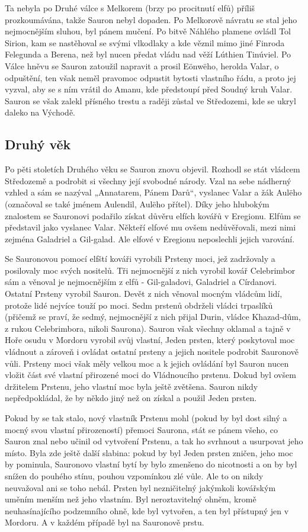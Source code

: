 \documentclass[12pt]{article}
\begin{document}
Ta nebyla po Druhé válce s Melkorem (brzy po procitnutí elfů) příliš prozkoumávána, takže Sauron nebyl dopaden. Po Melkorově návratu se stal jeho nejmocnějším sluhou, byl pánem mučení. Po bitvě Náhlého plamene ovládl Tol Sirion, kam se nastěhoval se svými vlkodlaky a kde věznil mimo jiné Finroda Felegunda a Berena, než byl nucen předat vládu nad věží Lúthien Tinúviel. Po Válce hněvu se Sauron zatoužil napravit a prosil Eönwëho, herolda Valar, o odpuštění, ten však neměl pravomoc odpustit bytosti vlastního řádu, a proto jej vyzval, aby se s ním vrátil do Amanu, kde předstoupí před Soudný kruh Valar. Sauron se však zalekl přísného trestu a raději zůstal ve Středozemi, kde se ukryl daleko na Východě. 

\subsection{Druhý věk}
Po pěti stoletích Druhého věku se Sauron znovu objevil. Rozhodl se stát vládcem Středozemě a podrobit si všechny její svobodné národy. Vzal na sebe nádherný vzhled a sám se nazýval „Annatarem, Pánem Darů“, vyslanec Valar a žák Aulëho (označoval se také jménem Aulendil, Aulëho přítel). Díky jeho hlubokým znalostem se Sauronovi podařilo získat důvěru elfích kovářů v Eregionu. Elfům se představil jako vyslanec Valar. Někteří elfové mu ovšem nedůvěřovali, mezi nimi zejména Galadriel a Gil-galad. Ale elfové v Eregionu neposlechli jejich varování.

Se Sauronovou pomocí elfští kováři vyrobili Prsteny moci, jež zadržovaly a posilovaly moc svých nositelů. Tři nejmocnější z nich vyrobil kovář Celebrimbor sám a věnoval je nejmocnějším z elfů - Gil-galadovi, Galadriel a Círdanovi. Ostatní Prsteny vyrobil Sauron. Devět z nich věnoval mocným vládcům lidí, protože lidé nejvíce touží po moci. Sedm prstenů obdrželi vládci trpaslíků (přičemž se praví, že sedmý, nejmocnější z nich přijal Durin, vládce Khazad-dûm, z rukou Celebrimbora, nikoli Saurona). Sauron však všechny oklamal a tajně v Hoře osudu v Mordoru vyrobil svůj vlastní, Jeden prsten, který poskytoval moc vládnout a zároveň i ovládat ostatní prsteny a jejich nositele podrobit Sauronově vůli. Prsteny moci však měly velkou moc a k jejich ovládání byl Sauron nucen vložit část své vlastní přirozené moci do Vládnoucího prstenu. Dokud byl ovšem držitelem Prstenu, jeho vlastní moc byla ještě zvětšena. Sauron nikdy nepředpokládal, že by někdo jiný než on získal a použil Jeden prsten.

Pokud by se tak stalo, nový vlastník Prstenu mohl (pokud by byl dost silný a mocný svou vlastní přirozeností) přemoci Saurona, stát se pánem všeho, co Sauron znal nebo učinil od vytvoření Prstenu, a tak ho svrhnout a usurpovat jeho místo. Byla zde ještě další slabina: pokud by byl Jeden prsten zničen, jeho moc by pominula, Sauronovo vlastní bytí by bylo zmenšeno do nicotnosti a on by byl snížen do pouhého stínu, pouhou vzpomínkou zlé vůle. Ale to on nikdy neuvažoval ani se toho nebál. Prsten byl nezničitelný jakýmkoli kovářským uměním menším než jeho vlastním. Byl neroztavitelný ohněm, kromě neuhasínajícího podzemního ohně, kde byl vytvořen, a ten byl přístupný jen v Mordoru. A v každém případě byl na Sauronově prstu.
\end{document}
